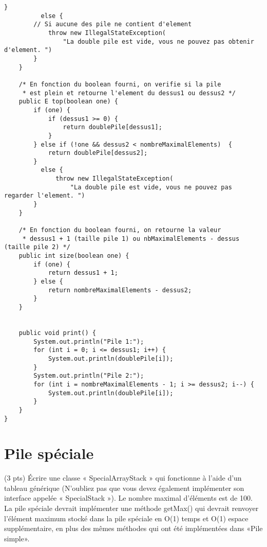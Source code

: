\documentclass[10pt]{report}
\begin{document}
\begin{lstlisting}[style=JavaDraculaWhite]
        }
          else {
        // Si aucune des pile ne contient d'element 
            throw new IllegalStateException(
                "La double pile est vide, vous ne pouvez pas obtenir d'element. ")
        }
    }

    /* En fonction du boolean fourni, on verifie si la pile 
     * est plein et retourne l'element du dessus1 ou dessus2 */
    public E top(boolean one) {
        if (one) {
            if (dessus1 >= 0) {
                return doublePile[dessus1];
            }
        } else if (!one && dessus2 < nombreMaximalElements)  {
            return doublePile[dessus2];
        }
          else {
              throw new IllegalStateException(
                  "La double pile est vide, vous ne pouvez pas regarder l'element. ")
        }
    }
    
    /* En fonction du boolean fourni, on retourne la valeur   
     * dessus1 + 1 (taille pile 1) ou nbMaximalElements - dessus (taille pile 2) */
    public int size(boolean one) {
        if (one) {
            return dessus1 + 1;
        } else {
            return nombreMaximalElements - dessus2;
        }
    }


    public void print() {
        System.out.println("Pile 1:");
        for (int i = 0; i <= dessus1; i++) {
            System.out.println(doublePile[i]);
        }
        System.out.println("Pile 2:");
        for (int i = nombreMaximalElements - 1; i >= dessus2; i--) {
            System.out.println(doublePile[i]);
        }
    }
}
    \end{lstlisting}

    \chapter{Pile spéciale}

    \begin{Exercice}{(3 pts)}{}
      Écrire une classe « SpecialArrayStack » qui fonctionne à l'aide 
      d'un tableau générique (N’oubliez pas que
      vous devez également implémenter son interface appelée « SpecialStack »).
      Le nombre maximal d’éléments est de 100. La pile spéciale devrait 
      implémenter une méthode getMax() qui devrait renvoyer
      l’élément maximum stocké dans la pile spéciale en O(1) temps et 
      O(1) espace supplémentaire, en plus des
      mêmes méthodes qui ont été implémentées dans «Pile simple».
    \end{Exercice}
\end{document}

